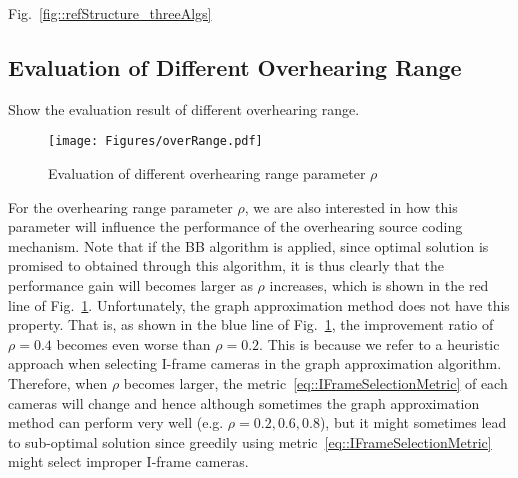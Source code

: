 Fig.~\ref{fig::refStructure_threeAlgs}

\subsection{Evaluation of Different Overhearing Range}
{\color{red}Show the evaluation result of different overhearing range.}
\begin{figure}
\begin{center}
\texttt{[image: Figures/overRange.pdf]}
\caption{\label{fig::evaOverRange}Evaluation of different overhearing range parameter $\rho$}
\end{center}
\end{figure}
%
For the overhearing range parameter $\rho$, we are also interested in how this parameter will influence the performance of the overhearing source coding mechanism.
Note that if the BB algorithm is applied, since optimal solution is promised to obtained through this algorithm, it is thus clearly that the performance gain will becomes larger as $\rho$ increases, which is shown in the red line of Fig.~\ref{fig::evaOverRange}.
Unfortunately, the graph approximation method does not have this property.
That is, as shown in the blue line of Fig.~\ref{fig::evaOverRange}, the improvement ratio of $\rho = 0.4$ becomes even worse than $\rho = 0.2$.
This is because we refer to a heuristic approach when selecting I-frame cameras in the graph approximation algorithm.
Therefore, when $\rho$ becomes larger, the metric~\eqref{eq::IFrameSelectionMetric} of each cameras will change and hence although sometimes the graph approximation method can perform very well (e.g. $\rho = 0.2,0.6,0.8$), but it might sometimes lead to sub-optimal solution since greedily using metric~\eqref{eq::IFrameSelectionMetric} might select improper I-frame cameras.

